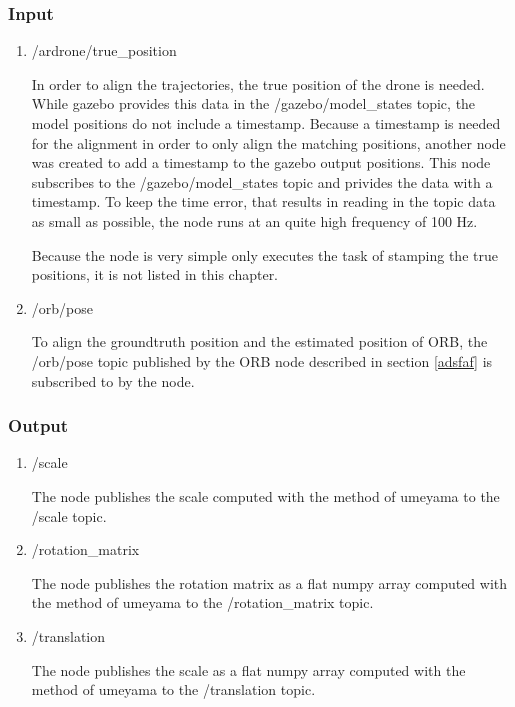 	
	\subsubsection{Input}
	
	\begin{enumerate}
	\item{/ardrone/true\_position}
	
	In order to align the trajectories, the true position of the drone is needed. 
	While gazebo provides this data in the /gazebo/model\_states topic, the model 
	positions do not include a timestamp. Because a timestamp is needed for the alignment 
	in order to only align the matching positions, another node was created to add a timestamp 
	to the gazebo output positions. This node subscribes to the /gazebo/model\_states topic 
	and privides the data with a timestamp. To keep the time error, that results in reading in 
	the topic data as small as possible, 
	the node runs at an quite high frequency of 100 Hz. 
	
	Because the node is very simple only executes the task of stamping the true positions, 
	it is not listed in this chapter. 
	
	\item{/orb/pose}
	
	To align the groundtruth position and the estimated position of ORB, the /orb/pose topic published 
	by the ORB node described in section \ref{adsfaf} is subscribed to by the node. 
	
	\end{enumerate}
	
	\subsubsection{Output}
	
	\begin{enumerate}
	\item{/scale}
	
	The node publishes the scale computed with the method of umeyama to  the /scale topic. 
	
	\item{/rotation\_matrix}
	
	The node publishes the rotation matrix as a flat numpy array computed with the method of umeyama to  the /rotation\_matrix topic.
	
	\item{/translation}
	
	The node publishes the scale as a flat numpy array computed with the method of umeyama to  the /translation topic.
	
	\end{enumerate}
	
